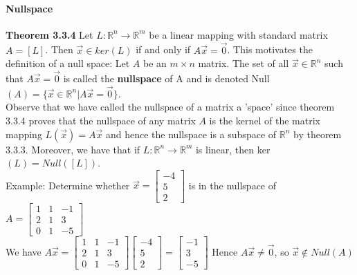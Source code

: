 \documentclass[10pt,letter]{article}
\begin{document}
\paragraph{Nullspace} \textbf{Theorem 3.3.4} Let $L:\mathbb{R}^n\rightarrow\mathbb{R}^m$ be a linear mapping with standard matrix $A=[L]$. Then $\vec{x}\in ker(L)$ if and only if $A\vec{x}=\vec{0}$. This motivates the definition of a null space: Let $A$ be an $m\times n$ matrix. The set of all $\vec{x}\in\mathbb{R}^n$ such that $A\vec{x}=\vec{0}$ is called the \textbf{nullspace} of A and is denoted Null$(A)=\{\vec{x}\in\mathbb{R}^n|A\vec{x}=\vec{0}\}$. \\ 
Observe that we have called the nullspace of a matrix a 'space' since theorem 3.3.4 proves that the nullspace of any matrix $A$ is the kernel of the matrix mapping $L(\vec{x})=A\vec{x}$ and hence the nullspace is a subspace of $\mathbb{R}^n$ by theorem 3.3.3. Moreover, we have that if $L:\mathbb{R}^n\rightarrow\mathbb{R}^m$ is linear, then ker$(L)=Null([L])$. \\ 
Example: Determine whether $\vec{x}=\begin{bmatrix}-4\\5\\2\end{bmatrix}$ is in the nullspace of $A = \begin{bmatrix}1&1&-1\\2&1&3\\0&1&-5\end{bmatrix}$ \\ 
We have $A\vec{x}=\begin{bmatrix}1&1&-1\\2&1&3\\0&1&-5\end{bmatrix}\begin{bmatrix}-4\\5\\2\end{bmatrix}=\begin{bmatrix}-1\\3\\-5\end{bmatrix}$ Hence $A\vec{x}\neq\vec{0}$, so $\vec{x}\not\in Null(A)$
\end{document}
